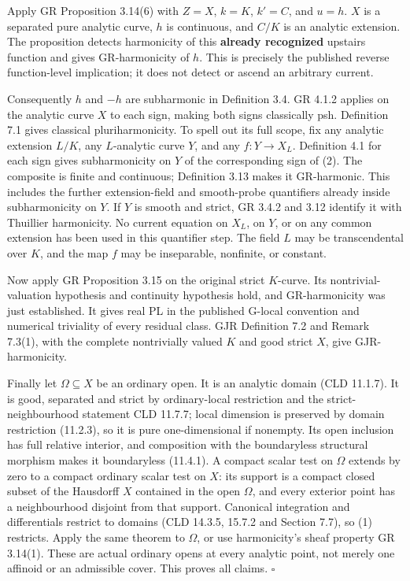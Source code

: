 \documentclass[
  11pt,
]{article}
\begin{document}
Apply GR Proposition 3.14(6) with \(Z=X\), \(k=K\), \(k'=C\), and
\(u=h\). \(X\) is a separated pure analytic curve, \(h\) is continuous,
and \(C/K\) is an analytic extension. The proposition detects
harmonicity of this \textbf{already recognized} upstairs function and
gives GR-harmonicity of \(h\). This is precisely the published reverse
function-level implication; it does not detect or ascend an arbitrary
current.

Consequently \(h\) and \(-h\) are subharmonic in Definition 3.4. GR
4.1.2 applies on the analytic curve \(X\) to each sign, making both
signs classically psh. Definition 7.1 gives classical pluriharmonicity.
To spell out its full scope, fix any analytic extension \(L/K\), any
\(L\)-analytic curve \(Y\), and any \(f:Y\to X_L\). Definition 4.1 for
each sign gives subharmonicity on \(Y\) of the corresponding sign of
(2). The composite is finite and continuous; Definition 3.13 makes it
GR-harmonic. This includes the further extension-field and smooth-probe
quantifiers already inside subharmonicity on \(Y\). If \(Y\) is smooth
and strict, GR 3.4.2 and 3.12 identify it with Thuillier harmonicity. No
current equation on \(X_L\), on \(Y\), or on any common extension has
been used in this quantifier step. The field \(L\) may be transcendental
over \(K\), and the map \(f\) may be inseparable, nonfinite, or
constant.

Now apply GR Proposition 3.15 on the original strict \(K\)-curve. Its
nontrivial-valuation hypothesis and continuity hypothesis hold, and
GR-harmonicity was just established. It gives real PL in the published
G-local convention and numerical triviality of every residual class. GJR
Definition 7.2 and Remark 7.3(1), with the complete nontrivially valued
\(K\) and good strict \(X\), give GJR-harmonicity.

Finally let \(\Omega\subseteq X\) be an ordinary open. It is an analytic
domain (CLD 11.1.7). It is good, separated and strict by ordinary-local
restriction and the strict-neighbourhood statement CLD 11.7.7; local
dimension is preserved by domain restriction (11.2.3), so it is pure
one-dimensional if nonempty. Its open inclusion has full relative
interior, and composition with the boundaryless structural morphism
makes it boundaryless (11.4.1). A compact scalar test on \(\Omega\)
extends by zero to a compact ordinary scalar test on \(X\): its support
is a compact closed subset of the Hausdorff \(X\) contained in the open
\(\Omega\), and every exterior point has a neighbourhood disjoint from
that support. Canonical integration and differentials restrict to
domains (CLD 14.3.5, 15.7.2 and Section 7.7), so (1) restricts. Apply
the same theorem to \(\Omega\), or use harmonicity's sheaf property GR
3.14(1). These are actual ordinary opens at every analytic point, not
merely one affinoid or an admissible cover. This proves all claims.
\(\square\)
\end{document}

